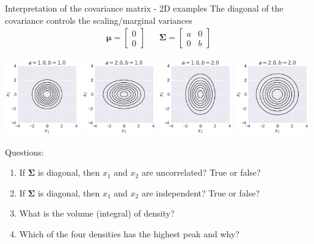 \begin{frame}{Interpretation of the covariance matrix - 2D examples}
	The diagonal of the covariance controls the scaling/marginal variances
	\begin{align}
		\bm{\mu} = \begin{bmatrix}0\\ 0\end{bmatrix} && \bm{\Sigma} = \begin{bmatrix}a& 0\\ 0 & b \end{bmatrix}
	\end{align}

	\begin{center}
	\includegraphics[width=0.24\textwidth]{gauss_scaling0.png}
	\includegraphics[width=0.24\textwidth]{gauss_scaling1.png}
	\includegraphics[width=0.24\textwidth]{gauss_scaling2.png}
	\includegraphics[width=0.24\textwidth]{gauss_scaling3.png}
	\end{center}
	\vspace*{-0.5cm}

	\pause
	
	Questions:
	\begin{enumerate}
		\item If $\bm{\Sigma}$ is diagonal, then $x_1$ and $x_2$ are uncorrelated? True or false?
		\item If $\bm{\Sigma}$ is diagonal, then $x_1$ and $x_2$ are independent? True or false?
		\item What is the volume (integral) of density?
		\item Which of the four densities has the highest peak and why?
	\end{enumerate}
\end{frame}


